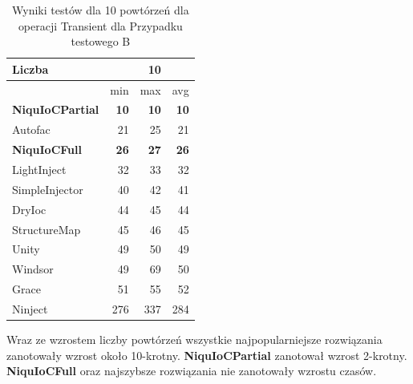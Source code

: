 \documentclass[12pt]{article}
\begin{document}
\begin{table}[H]
\captionsetup{belowskip=0pt,aboveskip=0pt}
\begin{center}
\begin{small}
	\begin{tabular}{ | l | r r r | }
    		\hline
Liczba & & 10 & \\ \hline
 & min & max & avg \\ \hline
\textbf{NiquIoCPartial} & \textbf{10} & \textbf{10} & \textbf{10} \\ \hline
Autofac & 21 & 25 & 21 \\ \hline
\textbf{NiquIoCFull} & \textbf{26} & \textbf{27} & \textbf{26} \\ \hline
LightInject & 32 & 33 & 32 \\ \hline
SimpleInjector & 40 & 42 & 41 \\ \hline
DryIoc & 44 & 45 & 44 \\ \hline
StructureMap & 45 & 46 & 45 \\ \hline
Unity & 49 & 50 & 49 \\ \hline
Windsor & 49 & 69 & 50 \\ \hline
Grace & 51 & 55 & 52 \\ \hline
Ninject & 276 & 337 & 284 \\ \hline
  	\end{tabular}
\end{small}
\end{center}
\caption{Wyniki testów dla 10 powtórzeń dla operacji Transient dla Przypadku testowego B}
\label{TestCaseB_Transient10}
\end{table}
Wraz ze wzrostem liczby powtórzeń wszystkie najpopularniejsze rozwiązania zanotowały wzrost około 10-krotny. \textbf{NiquIoCPartial} zanotował wzrost 2-krotny. \textbf{NiquIoCFull} oraz najszybsze rozwiązania nie zanotowały wzrostu czasów.
\\ \\
\end{document}
